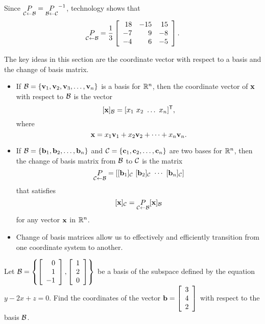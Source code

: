\begin{example}
	\item Since $\underset{\mathcal{C} \leftarrow \mathcal{B}}{P} = \underset{\mathcal{B} \leftarrow \mathcal{C}}{P}^{-1}$, technology shows that 
	\[\underset{\mathcal{C} \leftarrow \mathcal{B}}{P} = \frac{1}{3} \left[ \begin{array}{rrr} 18&-15&15\\-7&9&-8\\-4&6&-5 \end{array} \right].\]
	

	\ea
	
\end{example}



The key ideas in this section are the coordinate vector with respect to a basis and the change of basis matrix.

\begin{itemize}
\item If $\mathcal{B} = \{\mathbf{v}_1, \mathbf{v}_2, \mathbf{v}_3, \ldots, \mathbf{v}_n\}$ is a basis for $\mathbb{R}^n$, then the coordinate vector of $\mathbf{x}$ with respect to $\mathcal{B}$ is the vector
\[[\vx]_{\CB} = [x_1 \ x_2 \ \ldots \ x_n]^{\tr},\]
where
\[\mathbf{x} = x_1 \mathbf{v}_1 + x_2 \mathbf{v}_2 + \cdots + x_n \mathbf{v}_n.\]
\item If $\mathcal{B} = \{\mathbf{b}_1, \mathbf{b}_2, \ldots, \mathbf{b}_n\}$ and $\mathcal{C} = \{\mathbf{c}_1, \mathbf{c}_2, \ldots, \mathbf{c}_n\}$ are two bases for $\mathbb{R}^n$, then the change of basis matrix from $\mathcal{B}$ to $\mathcal{C}$ is the matrix
\[\underset{\mathcal{C} \leftarrow \mathcal{B}}{P} = [[\mathbf{b}_1]_{\mathcal{C}} \ [\mathbf{b}_2]_{\mathcal{C}}  \  \cdots  \ [\mathbf{b}_n]_{\mathcal{C}}]\]
that satisfies 
\[[\mathbf{x}]_{\mathcal{C}} = \underset{\mathcal{C} \leftarrow \mathcal{B}}{P}[\mathbf{x}]_{\mathcal{B}}\]
for any vector $\mathbf{x}$ in $\mathbb{R}^n$.
\item Change of basis matrices allow us to effectively and efficiently transition from one coordinate system to another. 
\end{itemize}



\be
\item Let $\mathcal{B}=\left\{ \left[ \begin{array}{r} 0\\1\\-1 \end{array} \right], \left[ \begin{array}{c} 1\\2\\0 \end{array} \right] \right\}$ be a basis of the subspace defined by the equation $y-2x+z=0$.
Find the coordinates of the vector $\mathbf{b}=\left[ \begin{array}{c} 3\\4\\2 \end{array} \right]$ with respect to the basis $\mathcal{B}$. 
 
